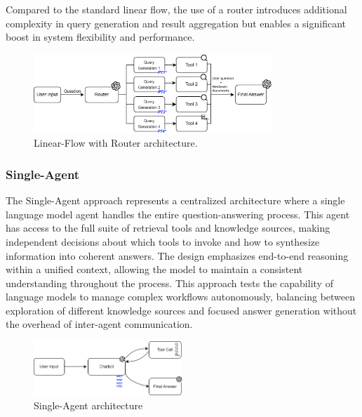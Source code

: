                 Compared to the standard linear flow, the use of a router introduces additional complexity in query generation and result aggregation but enables a significant boost in system flexibility and performance.

                \begin{figure}[h]
                    \centering
                    \includegraphics[width=0.8\textwidth]{images_exp2/diagrama_linear_w_router.png}
                    \caption{Linear-Flow with Router architecture.}
                    \label{fig:diagrama_linear_w_router}
                \end{figure}
                
                

                
            \subsubsection{Single-Agent}

                The Single-Agent approach represents a centralized architecture where a single language model agent handles the entire question-answering process. This agent has access to the full suite of retrieval tools and knowledge sources, making independent decisions about which tools to invoke and how to synthesize information into coherent answers. The design emphasizes end-to-end reasoning within a unified context, allowing the model to maintain a consistent understanding throughout the process. This approach tests the capability of language models to manage complex workflows autonomously, balancing between exploration of different knowledge sources and focused answer generation without the overhead of inter-agent communication.
                
                \begin{figure}[h]
                    \centering
                    \includegraphics[width=0.5\textwidth]{images_exp2/diagrama_single_agent.png}
                    \caption{Single-Agent architecture}
                    \label{fig:diagrama_single_agent}
                \end{figure}


